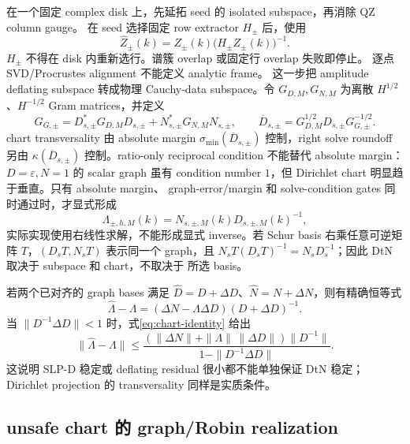 \documentclass[UTF8,fontset=fandol,11pt,a4paper]{ctexart}
\begin{document}
在一个固定 complex disk 上，先延拓 seed 的 isolated subspace，再消除 QZ column gauge。
在 seed 选择固定 row extractor $H_\pm$ 后，使用
\[
  \widehat Z_\pm(k)
  =Z_\pm(k)\bigl(H_\pm Z_\pm(k)\bigr)^{-1}.
\]
$H_\pm$ 不得在 disk 内重新选行。谱簇 overlap 或固定行 overlap 失败即停止。
逐点 SVD/Procrustes alignment 不能定义 analytic frame。
这一步把 amplitude deflating subspace 转成物理 Cauchy-data subspace。令
$G_{D,M},G_{N,M}$ 为离散 $H^{1/2}$、$H^{-1/2}$ Gram matrices，并定义
\[
  G_{G,\pm}=D_{s,\pm}^*G_{D,M}D_{s,\pm}
  +N_{s,\pm}^*G_{N,M}N_{s,\pm},
  \qquad
  \overline D_{s,\pm}
  =G_{D,M}^{1/2}D_{s,\pm}G_{G,\pm}^{-1/2}.
\]
chart transversality 由 absolute margin
$\sigma_{\min}(\overline D_{s,\pm})$ 控制，right solve roundoff 另由
$\kappa(\overline D_{s,\pm})$ 控制。ratio-only
reciprocal condition 不能替代 absolute margin：$D=\varepsilon,N=1$ 的 scalar graph
虽有 condition number $1$，但 Dirichlet chart 明显趋于垂直。只有 absolute margin、
graph-error/margin 和 solve-condition gates 同时通过时，才显式形成
\begin{equation}
  \Lambda_{\pm,h,M}(k)
  =N_{s,\pm,M}(k)D_{s,\pm,M}(k)^{-1},
  \label{eq:discrete-dtn}
\end{equation}
实际实现使用右线性求解，不能形成显式 inverse。若 Schur basis 右乘任意可逆矩阵
$T$，$(D_sT,N_sT)$ 表示同一个 graph，且
$N_sT(D_sT)^{-1}=N_sD_s^{-1}$；因此 DtN 取决于 subspace 和 chart，不取决于
所选 basis。

若两个已对齐的 graph bases 满足
$\widehat D=D+\Delta D$、$\widehat N=N+\Delta N$，则有精确恒等式
\begin{equation}
  \widehat\Lambda-\Lambda
  =(\Delta N-\Lambda\Delta D)(D+\Delta D)^{-1}.
  \label{eq:chart-identity}
\end{equation}
当 $\|D^{-1}\Delta D\|<1$ 时，式\eqref{eq:chart-identity} 给出
\[
  \|\widehat\Lambda-\Lambda\|
  \le
  \frac{(\|\Delta N\|+\|\Lambda\|\,\|\Delta D\|)\|D^{-1}\|}
       {1-\|D^{-1}\Delta D\|}.
\]
这说明 SLP-D 稳定或 deflating residual 很小都不能单独保证 DtN 稳定；Dirichlet
projection 的 transversality 同样是实质条件。

\subsection{unsafe chart 的 graph/Robin realization}
\end{document}
